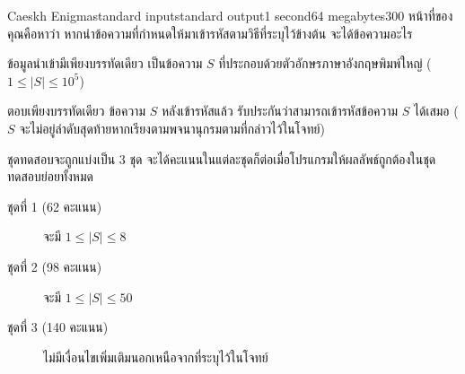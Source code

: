 \documentclass[11pt,a4paper]{article}
\begin{document}
\begin{problem}{Caeskh Enigma}{standard input}{standard output}{1 second}{64 megabytes}{300}
หน้าที่ของคุณคือหาว่า หากนำข้อความที่กำหนดให้มาเข้ารหัสตามวิธีที่ระบุไว้ข้างต้น จะได้ข้อความอะไร

\InputFile
ข้อมูลนำเข้ามีเพียงบรรทัดเดียว เป็นข้อความ $S$ ที่ประกอบด้วยตัวอักษรภาษาอังกฤษพิมพ์ใหญ่ ($1 \leq |S| \leq 10^5$)

\OutputFile
ตอบเพียงบรรทัดเดียว ข้อความ $S$ หลังเข้ารหัสแล้ว รับประกันว่าสามารถเข้ารหัสข้อความ $S$ ได้เสมอ ($S$ จะไม่อยู่ลำดับสุดท้ายหากเรียงตามพจนานุกรมตามที่กล่าวไว้ในโจทย์)

\Scoring
ชุดทดสอบจะถูกแบ่งเป็น 3 ชุด จะได้คะแนนในแต่ละชุดก็ต่อเมื่อโปรแกรมให้ผลลัพธ์ถูกต้องในชุดทดสอบย่อยทั้งหมด

\begin{description}

\item[ชุดที่ 1 (62 คะแนน)] จะมี $1 \leq |S| \leq 8$

\item[ชุดที่ 2 (98 คะแนน)] จะมี $1 \leq |S| \leq 50$

\item[ชุดที่ 3 (140 คะแนน)] ไม่มีเงื่อนไขเพิ่มเติมนอกเหนือจากที่ระบุไว้ในโจทย์

\end{description}

\Examples

\begin{example}
%
\end{example}

\end{problem}
\end{document}
